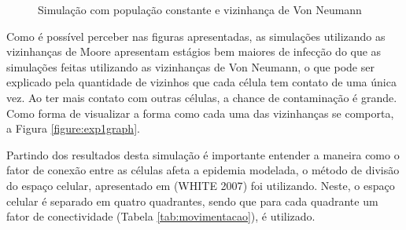 \documentclass[a4paper,12pt]{article}
\begin{document}
\begin{figure}[!ht]
\qquad
{}
\qquad
{}
\caption{Simulação com população constante e vizinhança de Von Neumann}
\label{figure:exp1vonneumann}
\end{figure}

Como é possível perceber nas figuras apresentadas, as simulações utilizando as vizinhanças de Moore apresentam estágios bem maiores de infecção do que as simulações feitas utilizando as vizinhanças de Von Neumann, o que pode ser explicado pela quantidade de vizinhos que cada célula tem contato de uma única vez. Ao ter mais contato com outras células, a chance de contaminação é grande. Como forma de visualizar a forma como cada uma das vizinhanças se comporta, a Figura \ref{figure:exp1graph}. 

\newpage
Partindo dos resultados desta simulação é importante entender a maneira como o fator de conexão entre as células afeta a epidemia modelada, o método de divisão do espaço celular, apresentado em (WHITE 2007\cite{White2007}) foi utilizando. Neste, o espaço celular é separado em quatro quadrantes, sendo que para cada quadrante um fator de conectividade (Tabela \ref{tab:movimentacao}), é utilizado. 
\end{document}

